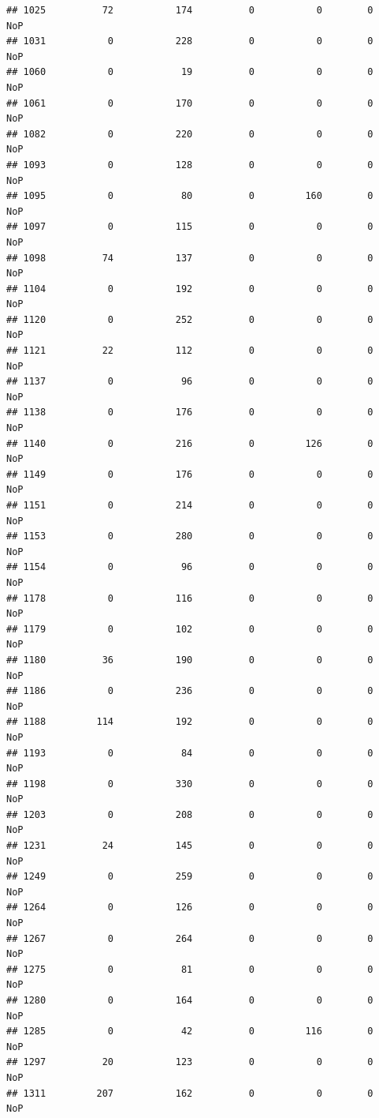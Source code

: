 \documentclass[]{article}
\begin{document}
\begin{verbatim}
## 1025          72           174          0           0        0    NoP
## 1031           0           228          0           0        0    NoP
## 1060           0            19          0           0        0    NoP
## 1061           0           170          0           0        0    NoP
## 1082           0           220          0           0        0    NoP
## 1093           0           128          0           0        0    NoP
## 1095           0            80          0         160        0    NoP
## 1097           0           115          0           0        0    NoP
## 1098          74           137          0           0        0    NoP
## 1104           0           192          0           0        0    NoP
## 1120           0           252          0           0        0    NoP
## 1121          22           112          0           0        0    NoP
## 1137           0            96          0           0        0    NoP
## 1138           0           176          0           0        0    NoP
## 1140           0           216          0         126        0    NoP
## 1149           0           176          0           0        0    NoP
## 1151           0           214          0           0        0    NoP
## 1153           0           280          0           0        0    NoP
## 1154           0            96          0           0        0    NoP
## 1178           0           116          0           0        0    NoP
## 1179           0           102          0           0        0    NoP
## 1180          36           190          0           0        0    NoP
## 1186           0           236          0           0        0    NoP
## 1188         114           192          0           0        0    NoP
## 1193           0            84          0           0        0    NoP
## 1198           0           330          0           0        0    NoP
## 1203           0           208          0           0        0    NoP
## 1231          24           145          0           0        0    NoP
## 1249           0           259          0           0        0    NoP
## 1264           0           126          0           0        0    NoP
## 1267           0           264          0           0        0    NoP
## 1275           0            81          0           0        0    NoP
## 1280           0           164          0           0        0    NoP
## 1285           0            42          0         116        0    NoP
## 1297          20           123          0           0        0    NoP
## 1311         207           162          0           0        0    NoP

\end{verbatim}
\end{document}

